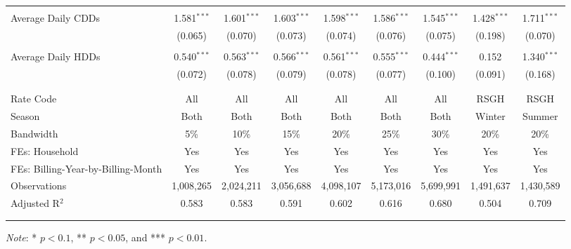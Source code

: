 {\begin{table}[t!]
\begin{adjustbox}{scale = 0.85}
\begin{threeparttable}
\begin{tabular}{@{\extracolsep{5pt}}lcccccccc}
                    & & & & & & & & \\ 
                    Average Daily CDDs & 1.581$^{***}$ & 1.601$^{***}$ & 1.603$^{***}$ & 1.598$^{***}$ & 1.586$^{***}$ & 1.545$^{***}$ & 1.428$^{***}$ & 1.711$^{***}$ \\ 
                    & (0.065) & (0.070) & (0.073) & (0.074) & (0.076) & (0.075) & (0.198) & (0.070) \\ 
                    & & & & & & & & \\ 
                    Average Daily HDDs & 0.540$^{***}$ & 0.563$^{***}$ & 0.566$^{***}$ & 0.561$^{***}$ & 0.555$^{***}$ & 0.444$^{***}$ & 0.152 & 1.340$^{***}$ \\ 
                    & (0.072) & (0.078) & (0.079) & (0.078) & (0.077) & (0.100) & (0.091) & (0.168) \\ 
                    & & & & & & & & \\
                    \hline
                    \\[-2.0ex]
                    Rate Code & All & All & All & All & All & All & RSGH & RSGH \\ 
                    Season & Both & Both & Both & Both & Both & Both & Winter & Summer \\ 
                    Bandwidth & 5\% & 10\% & 15\% & 20\% & 25\% & 30\% & 20\% & 20\% \\ 
                    FEs: Household & Yes & Yes & Yes & Yes & Yes & Yes & Yes & Yes \\ 
                    FEs: Billing-Year-by-Billing-Month & Yes & Yes & Yes & Yes & Yes & Yes & Yes & Yes \\ 
                    Observations & 1,008,265 & 2,024,211 & 3,056,688 & 4,098,107 & 5,173,016 & 5,699,991 & 1,491,637 & 1,430,589 \\ 
                    Adjusted R$^{2}$ & 0.583 & 0.583 & 0.591 & 0.602 & 0.616 & 0.680 & 0.504 & 0.709 \\
                    \\[-2.0ex]
                    \hline \hline
                    \\[-4.5ex]
                \end{tabular}
                \begin{tablenotes}[flushleft]
                    \footnotesize
                    \item \textit{Note}: * $p < 0.1$, ** $p < 0.05$, and *** $p < 0.01$.
                \end{tablenotes}
            \end{threeparttable}
        \end{adjustbox}
    \end{table}
}
